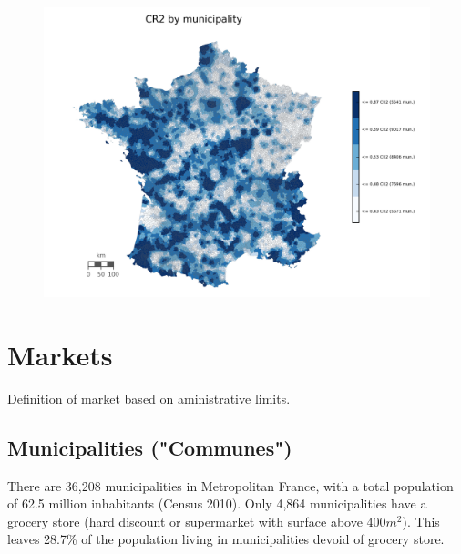 \documentclass[11pt]{article}
\begin{document}
\begin{figure}[H]
	\centering
		\includegraphics[width=14cm]{images/maps_competition/fra_com_CR2.png}
\end{figure}

\section{Markets}

Definition of market based on aministrative limits.

\subsection{Municipalities ("Communes")}

There are 36,208 municipalities in Metropolitan France, with a total population of 62.5 million inhabitants (Census 2010). Only 4,864 municipalities have a grocery store (hard discount or supermarket with surface above $400m^2$). This leaves 28.7\% of the population living in municipalities devoid of grocery store.
\end{document}
